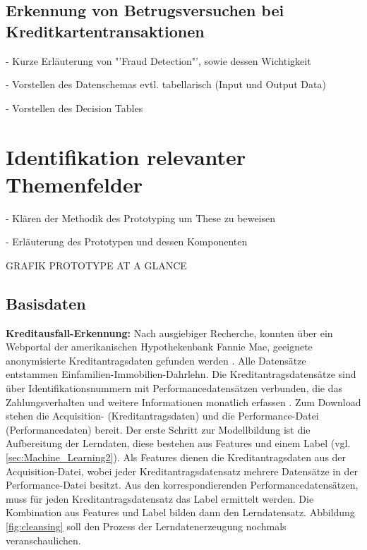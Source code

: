 \subsection{Erkennung von Betrugsversuchen bei Kreditkartentransaktionen}
\label{subsec:Banktransaktionen3}

- Kurze Erläuterung von "'Fraud Detection"', sowie dessen Wichtigkeit

- Vorstellen des Datenschemas evtl. tabellarisch (Input und Output Data) 

- Vorstellen des Decision Tables

\section{Identifikation relevanter Themenfelder}
\label{subsec:Themenfelder3}

- Klären der Methodik des Prototyping um These zu beweisen

- Erläuterung des Prototypen und dessen Komponenten 
 
GRAFIK PROTOTYPE AT A GLANCE

\subsection{Basisdaten}
\label{subsec:Basisdaten3}

\textbf{Kreditausfall-Erkennung:} Nach ausgiebiger Recherche, konnten über ein Webportal der amerikanischen Hypothekenbank Fannie Mae, geeignete anonymisierte Kreditantragsdaten gefunden werden \cite{FM17}. Alle Datensätze entstammen Einfamilien-Immobilien-Dahrlehn. Die Kreditantragsdatensätze sind über Identifikationsnummern mit Performancedatensätzen verbunden, die das Zahlungsverhalten und weitere Informationen monatlich erfassen \cite{FM18}. Zum Download stehen die Acquisition- (Kreditantragsdaten) und die Performance-Datei (Performancedaten) bereit. Der erste Schritt zur Modellbildung ist die Aufbereitung der Lerndaten, diese bestehen aus Features und einem Label (vgl. \ref{sec:Machine_Learning2}).     
Als Features dienen die Kreditantragsdaten aus der Acquisition-Datei, wobei jeder Kreditantragsdatensatz mehrere Datensätze in der Performance-Datei besitzt. Aus den korrespondierenden Performancedatensätzen, muss für jeden Kreditantragsdatensatz das Label ermittelt werden. Die Kombination aus Features und Label bilden dann den Lerndatensatz. Abbildung \ref{fig:cleansing} soll den Prozess der Lerndatenerzeugung nochmals veranschaulichen.


